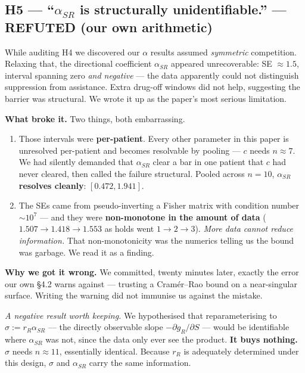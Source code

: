 \documentclass[11pt,a4paper]{article}
\newcommand{\aSR}{\alpha_{SR}}
\begin{document}
\subsection*{H5 --- ``$\aSR$ is structurally unidentifiable.'' --- \textcolor{red!60!black}{REFUTED (our own arithmetic)}}

While auditing H4 we discovered our $\alpha$ results assumed \emph{symmetric}
competition. Relaxing that, the directional coefficient $\aSR$ appeared unrecoverable:
SE $\approx 1.5$, interval spanning zero \emph{and negative} --- the data apparently
could not distinguish suppression from assistance. Extra drug-off windows did not help,
suggesting the barrier was structural. We wrote it up as the paper's most serious
limitation.

\textbf{What broke it.} Two things, both embarrassing.

\begin{enumerate}[leftmargin=1.6em,itemsep=0.3em]
\item Those intervals were \textbf{per-patient}. Every other parameter in this paper is
unresolved per-patient and becomes resolvable by pooling --- $c$ needs $n \approx 7$. We
had silently demanded that $\aSR$ clear a bar in one patient that $c$ had never cleared,
then called the failure structural. Pooled across $n = 10$, \textbf{$\aSR$ resolves
cleanly}: $[0.472, 1.941]$.
\item The SEs came from pseudo-inverting a Fisher matrix with condition number
${\sim}10^{7}$ --- and they were \textbf{non-monotone in the amount of data}
($1.507 \to 1.418 \to 1.553$ as holds went $1 \to 2 \to 3$). \emph{More data cannot
reduce information.} That non-monotonicity was the numerics telling us the bound was
garbage. We read it as a finding.
\end{enumerate}

\textbf{Why we got it wrong.} We committed, twenty minutes later, exactly the error our
own \S4.2 warns against --- trusting a Cram\'er--Rao bound on a near-singular surface.
Writing the warning did not immunise us against the mistake.

\emph{A negative result worth keeping.} We hypothesised that reparameterising to
$\sigma := r_R \aSR$ --- the directly observable slope $-\partial g_R/\partial S$ ---
would be identifiable where $\aSR$ was not, since the data only ever see the product.
\textbf{It buys nothing.} $\sigma$ needs $n \approx 11$, essentially identical. Because
$r_R$ is adequately determined under this design, $\sigma$ and $\aSR$ carry the same
information.
\end{document}

